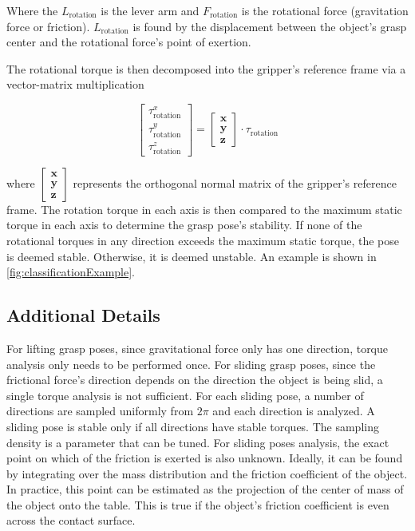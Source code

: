 \documentclass[12pt]{ucsddissertation}
\begin{document}
Where the $L_{\mathrm{rotation}}$ is the lever arm and $F_{\mathrm{rotation}}$ is the rotational force (gravitation force or friction). $L_{\mathrm{rotation}}$ is found by the displacement between the object's grasp center and the rotational force's point of exertion.

The rotational torque is then decomposed into the gripper's reference frame via a vector-matrix multiplication

\[
 \begin{bmatrix}
\tau_{\mathrm{rotation}}^x \\
\tau_{\mathrm{rotation}}^y \\
\tau_{\mathrm{rotation}}^z
\end{bmatrix}  
= 
 \begin{bmatrix}
\textbf{x} \\
\textbf{y} \\
\textbf{z}
\end{bmatrix} 
\cdot
\tau_{\mathrm{rotation}}
\]

where $\begin{bmatrix}
\textbf{x} \\
\textbf{y} \\
\textbf{z}
\end{bmatrix} $ represents the orthogonal normal matrix of the gripper's reference frame. The rotation torque in each axis is then compared to the maximum static torque in each axis to determine the grasp pose's stability. If none of the rotational torques in any direction exceeds the maximum static torque, the pose is deemed stable. Otherwise, it is deemed unstable. An example is shown in \ref{fig:classificationExample}.

\subsection{Additional Details}
For lifting grasp poses, since gravitational force only has one direction, torque analysis only needs to be performed once. For sliding grasp poses, since the frictional force's direction depends on the direction the object is being slid, a single torque analysis is not sufficient. For each sliding pose, a number of directions are sampled uniformly from $2\pi$ and each direction is analyzed. A sliding pose is stable only if all directions have stable torques. The sampling density is a parameter that can be tuned. For sliding poses analysis, the exact point on which of the friction is exerted is also unknown. Ideally, it can be found by integrating over the mass distribution and the friction coefficient of the object. In practice, this point can be estimated as the projection of the center of mass of the object onto the table. This is true if the object's friction coefficient is even across the contact surface.
\end{document}
